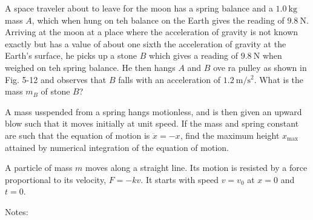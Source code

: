 \documentclass[../feynman-lectures-on-physics.tex]{subfiles}
\begin{document}
\begin{questions}

\question A space traveler about to leave for the moon has a spring balance and
a $\SI{1.0}{\kilo\gram}$ mass $A$, which when hung on teh balance on the Earth
gives the reading of $\SI{9.8}{\newton}$. Arriving at the moon at a place where
the acceleration of gravity is not known exactly but has a value of about one
sixth the acceleration of gravity at the Earth's surface, he picks up a stone
$B$ which gives a reading of $\SI{9.8}{\newton}$ when weighed on teh spring
balance. He then hangs $A$ and $B$ ove ra pulley as shown in Fig. 5-12 and
observes that $B$ falls with an acceleration of
$\SI{1.2}{\meter\per\second\squared}$. What is the mass $m_B$ of stone $B$?

\question A mass usspended from a spring hangs motionless, and is then given an
upward blow such that it moves initially at unit speed. If the mass and spring
constant are such that the equation of motion is $\ddot{x} = -x$, find the
maximum height $x_{\text{max}}$ attained by numerical integration of the
equation of motion.

\question A particle of mass $m$ moves along a straight line. Its motion is
resisted by a force proportional to its velocity, $F=-kv$. It starts with speed
$v=v_0$ at $x=0$ and $t=0$.
Notes:
\end{questions}
\end{document}
